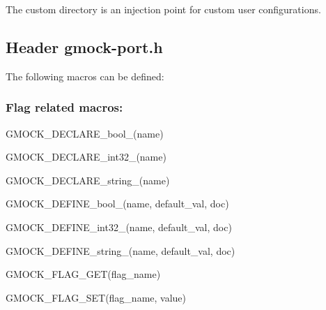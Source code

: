 The custom directory is an injection point for custom user configurations.

\subsection*{Header {\ttfamily gmock-\/port.\+h}}

The following macros can be defined\+:

\subsubsection*{Flag related macros\+:}


\begin{DoxyItemize}
\item {\ttfamily G\+M\+O\+C\+K\+\_\+\+D\+E\+C\+L\+A\+R\+E\+\_\+bool\+\_\+(name)}
\item {\ttfamily G\+M\+O\+C\+K\+\_\+\+D\+E\+C\+L\+A\+R\+E\+\_\+int32\+\_\+(name)}
\item {\ttfamily G\+M\+O\+C\+K\+\_\+\+D\+E\+C\+L\+A\+R\+E\+\_\+string\+\_\+(name)}
\item {\ttfamily G\+M\+O\+C\+K\+\_\+\+D\+E\+F\+I\+N\+E\+\_\+bool\+\_\+(name, default\+\_\+val, doc)}
\item {\ttfamily G\+M\+O\+C\+K\+\_\+\+D\+E\+F\+I\+N\+E\+\_\+int32\+\_\+(name, default\+\_\+val, doc)}
\item {\ttfamily G\+M\+O\+C\+K\+\_\+\+D\+E\+F\+I\+N\+E\+\_\+string\+\_\+(name, default\+\_\+val, doc)}
\item {\ttfamily G\+M\+O\+C\+K\+\_\+\+F\+L\+A\+G\+\_\+\+G\+E\+T(flag\+\_\+name)}
\item {\ttfamily G\+M\+O\+C\+K\+\_\+\+F\+L\+A\+G\+\_\+\+S\+E\+T(flag\+\_\+name, value)} 
\end{DoxyItemize}